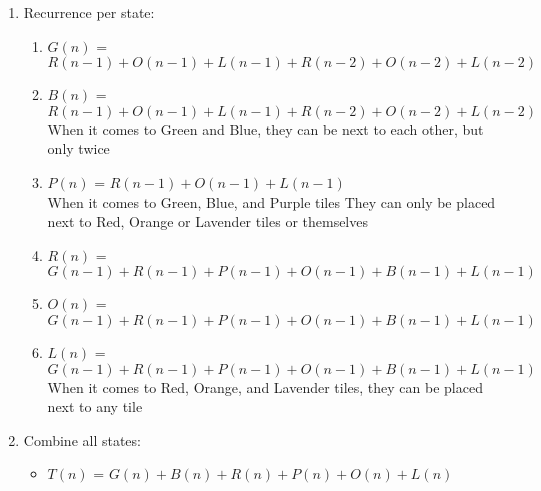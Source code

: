 \documentclass[11pt]{article}
\newcounter{prnum}
\newenvironment{problem}{{\vskip 0.2in\noindent\bf Problem
       \addtocounter{prnum}{1} \arabic{prnum}.}}{\vskip 0.1in}
\begin{document}
\begin{problem}
\begin{enumerate}
  \item Recurrence per state:
    \begin{enumerate}
      \item $G(n)$ = $R(n-1) + O(n-1) + L(n-1) + R(n-2) + O(n-2) + L(n-2)$
      \item $B(n)$ = $R(n-1) + O(n-1) + L(n-1) + R(n-2) + O(n-2) + L(n-2)$\\
        When it comes to Green and Blue, they can be next to each other, but only twice
      \item $P(n)$ = $R(n-1) + O(n-1) + L(n-1)$\\
        When it comes to Green, Blue, and Purple tiles
      They can only be placed next to Red, Orange or Lavender tiles or themselves

      \item $R(n)$ = $G(n-1) + R(n-1) + P(n-1) + O(n-1) + B(n-1) + L(n-1)$


      \item $O(n)$ = $G(n-1) + R(n-1) + P(n-1) + O(n-1) + B(n-1) + L(n-1)$
      \item $L(n)$ = $G(n-1) + R(n-1) + P(n-1) + O(n-1) + B(n-1) + L(n-1)$\\
        When it comes to Red, Orange, and Lavender tiles, they can be placed next to any tile
    \end{enumerate}
  \item Combine all states:
    \begin{itemize}
      \item $T(n)$ = $G(n) + B(n) + R(n) + P(n) + O(n) + L(n)$
    \end{itemize}
    \pagebreak


\end{enumerate}
\end{problem}
\end{document}
